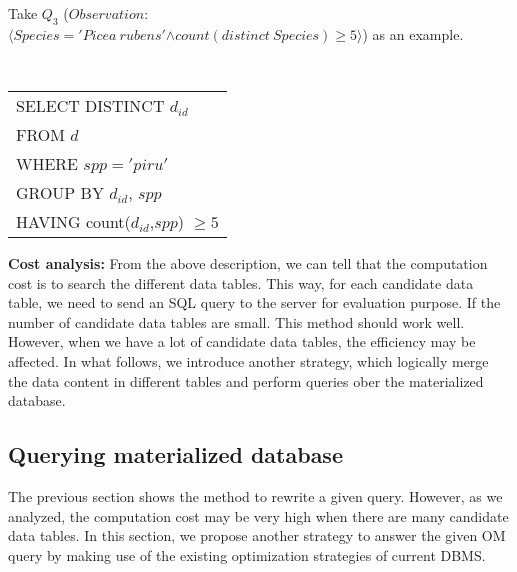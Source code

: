 \begin{example}
Take $Q_3$ ($Observation:$\\
$\langle Species='Picea~rubens'$$\wedge count(distinct~Species)\geq
5\rangle$) as an example.


\vspace{0.1in}
{\tt
\begin{tabular}{l}
SELECT DISTINCT $d_{id}$\\
FROM $d$\\
WHERE $spp = 'piru'$\\
GROUP BY $d_{id}$, $spp$\\
HAVING count($d_{id}$,$spp$) $\geq 5$\\
\end{tabular}
}
\vspace{0.1in}

\end{example}

{\bf Cost analysis:}
From the above description, we can tell that the computation cost is to search the different data
tables. This way, for each candidate data table, we need to send an
SQL query to the server for evaluation purpose.
If the number of candidate data tables are small. This method should
work well. However, when we have a lot of candidate data tables, the
efficiency may be affected.
In what follows, we introduce another strategy, which logically merge
the data content in different tables and perform queries ober the
materialized database.

\subsection{Querying materialized database}\label{sec:matdb}

The previous section shows the method to rewrite a given query.
However, as we analyzed, the computation cost may be very high when
there are many candidate data tables.
In this section, we propose another strategy to answer the given OM
query by making use of the existing optimization strategies of
current DBMS.

